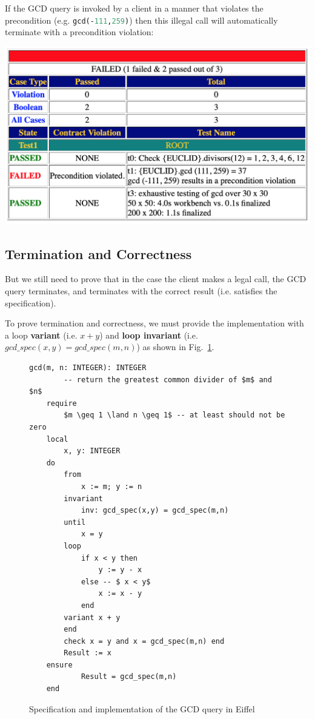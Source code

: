 \documentclass[runningheads,12pt]{article}
\newcommand{\e}[1]{\lstinline[language=eiffel]|#1|}
\begin{document}
If the GCD query is invoked by a client in a manner that violates the precondition (e.g. \e{gcd(-111,259)}) then this illegal call will automatically terminate with a precondition violation:

\includegraphics[width=.8\textwidth]{images/precondition-violate.png}

\subsection{Termination and Correctness} 

But we still need to prove that in the case the client makes a legal call, the GCD query terminates,  and terminates with the correct result (i.e. satisfies the specification).

To prove termination and correctness, we must provide the implementation with a loop \textbf{variant} (i.e. $x +y$) and \textbf{loop invariant} (i.e. $gcd\_spec(x,y) = gcd\_spec(m,n)$) as shown in Fig.~\ref{fig:gcd}.

\begin{figure}[!htb]
\begin{framed}
\caption{Specification and implementation of the GCD query in Eiffel}
\label{fig:gcd}
\lstset{language=eiffel}    
\begin{lstlisting} 
gcd(m, n: INTEGER): INTEGER
		-- return the greatest common divider of $m$ and $n$
	require
		$m \geq 1 \land n \geq 1$ -- at least should not be zero
	local
		x, y: INTEGER
	do
		from
			x := m; y := n
		invariant 
			inv: gcd_spec(x,y) = gcd_spec(m,n)
		until
			x = y
		loop
			if x < y then
				y := y - x
			else -- $ x < y$
				x := x - y
			end
		variant x + y
		end
		check x = y and x = gcd_spec(m,n) end
		Result := x
	ensure 
			Result = gcd_spec(m,n)
	end
\end{lstlisting} 
\end{framed}
\end{figure}
\end{document}
